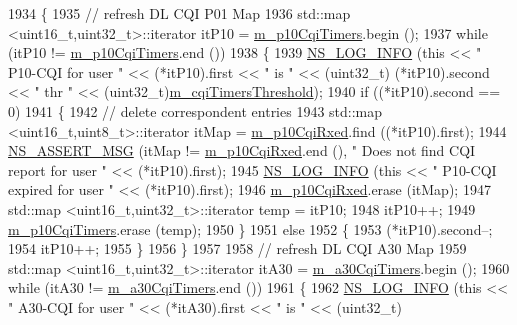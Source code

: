 \begin{DoxyCode}
1934 \{
1935   \textcolor{comment}{// refresh DL CQI P01 Map}
1936   std::map <uint16\_t,uint32\_t>::iterator itP10 = \hyperlink{classns3_1_1TdBetFfMacScheduler_a1b59f4b00f23f363702a1c9679fe18a1}{m\_p10CqiTimers}.begin ();
1937   \textcolor{keywordflow}{while} (itP10 != \hyperlink{classns3_1_1TdBetFfMacScheduler_a1b59f4b00f23f363702a1c9679fe18a1}{m\_p10CqiTimers}.end ())
1938     \{
1939       \hyperlink{group__logging_gafbd73ee2cf9f26b319f49086d8e860fb}{NS\_LOG\_INFO} (\textcolor{keyword}{this} << \textcolor{stringliteral}{" P10-CQI for user "} << (*itP10).first << \textcolor{stringliteral}{" is "} << (uint32\_t)
      (*itP10).second << \textcolor{stringliteral}{" thr "} << (uint32\_t)\hyperlink{classns3_1_1TdBetFfMacScheduler_ad423d7c181e089b37159502bad92bccd}{m\_cqiTimersThreshold});
1940       \textcolor{keywordflow}{if} ((*itP10).second == 0)
1941         \{
1942           \textcolor{comment}{// delete correspondent entries}
1943           std::map <uint16\_t,uint8\_t>::iterator itMap = \hyperlink{classns3_1_1TdBetFfMacScheduler_a30205ddb38c83dab20b1c059df052679}{m\_p10CqiRxed}.find ((*itP10).first);
1944           \hyperlink{assert_8h_aff5ece9066c74e681e74999856f08539}{NS\_ASSERT\_MSG} (itMap != \hyperlink{classns3_1_1TdBetFfMacScheduler_a30205ddb38c83dab20b1c059df052679}{m\_p10CqiRxed}.end (), \textcolor{stringliteral}{" Does not find CQI report
       for user "} << (*itP10).first);
1945           \hyperlink{group__logging_gafbd73ee2cf9f26b319f49086d8e860fb}{NS\_LOG\_INFO} (\textcolor{keyword}{this} << \textcolor{stringliteral}{" P10-CQI expired for user "} << (*itP10).first);
1946           \hyperlink{classns3_1_1TdBetFfMacScheduler_a30205ddb38c83dab20b1c059df052679}{m\_p10CqiRxed}.erase (itMap);
1947           std::map <uint16\_t,uint32\_t>::iterator temp = itP10;
1948           itP10++;
1949           \hyperlink{classns3_1_1TdBetFfMacScheduler_a1b59f4b00f23f363702a1c9679fe18a1}{m\_p10CqiTimers}.erase (temp);
1950         \}
1951       \textcolor{keywordflow}{else}
1952         \{
1953           (*itP10).second--;
1954           itP10++;
1955         \}
1956     \}
1957 
1958   \textcolor{comment}{// refresh DL CQI A30 Map}
1959   std::map <uint16\_t,uint32\_t>::iterator itA30 = \hyperlink{classns3_1_1TdBetFfMacScheduler_a7e0161875c90392333763dd0b96b405a}{m\_a30CqiTimers}.begin ();
1960   \textcolor{keywordflow}{while} (itA30 != \hyperlink{classns3_1_1TdBetFfMacScheduler_a7e0161875c90392333763dd0b96b405a}{m\_a30CqiTimers}.end ())
1961     \{
1962       \hyperlink{group__logging_gafbd73ee2cf9f26b319f49086d8e860fb}{NS\_LOG\_INFO} (\textcolor{keyword}{this} << \textcolor{stringliteral}{" A30-CQI for user "} << (*itA30).first << \textcolor{stringliteral}{" is "} << (uint32\_t)

\end{DoxyCode}
